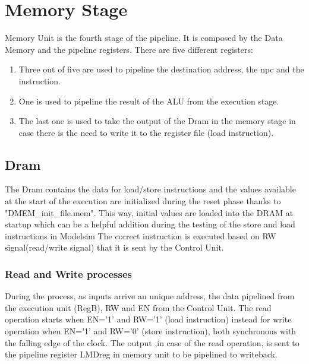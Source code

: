\chapter{Memory Stage}
\label{Memory Unit}
Memory Unit is the fourth stage of the pipeline. It is composed by the Data Memory and the pipeline registers. There are five different registers:
\begin{enumerate} 
    \item Three out of five are used to pipeline the destination address, the npc and the instruction.
    \item One is used to pipeline the result of the ALU from the execution stage.
    \item The last one is used to take the output of the Dram in the memory stage in case there is the need to write it to the register file (load instruction).
\end{enumerate} 
\section{Dram}
The Dram contains the data for load/store instructions and the values available at the start of the execution are initialized during the reset phase thanks to "DMEM\_init\_file.mem". 
This way, initial values are loaded into the DRAM at startup which can be a helpful addition during the testing of the store and load instructions in Modelsim
The correct instruction is executed based on RW signal(read/write signal) that it is sent by the Control Unit.
\subsection{Read and Write processes}
During the process,  as inputs arrive an unique address, the data pipelined from the execution unit (RegB), RW and EN from the Control Unit. The read operation starts 
when EN='1' and RW='1' (load instruction) instead for write operation when EN='1' and RW='0' (store instruction), both synchronous with the falling edge of the clock.
The output ,in case of the read operation, is sent to the pipeline register LMDreg in memory unit to be pipelined to writeback.